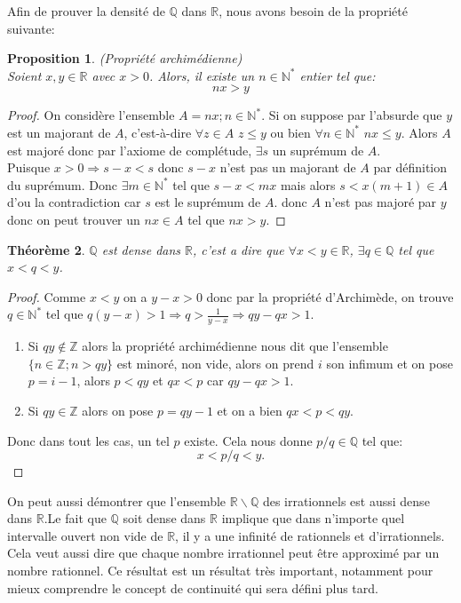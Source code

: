 \documentclass[a4paper, 12pt, french, twoside]{article}
\newtheorem{theorem}{Théorème}[section]
\newtheorem{proposition}[theorem]{Proposition}
\newcommand{\Nn}{{\mathbb{N}}}
\newcommand{\Zz}{{\mathbb{Z}}}
\newcommand{\Rr}{{\mathbb{R}}}
\newcommand{\Qq}{{\mathbb{Q}}}
\begin{document}
\begin{tcolorbox}
    

Afin de prouver la densité de $\Qq$ dans $\Rr$, nous avons besoin de la propriété suivante: 
\begin{proposition}
    (\textit{Propriété archimédienne})\\
    Soient $x,y\in \Rr$ avec $x>0$. Alors, il existe un $n\in \Nn^*$ entier tel que:
    $$nx>y$$
\end{proposition}
\begin{proof}
    On considère l'ensemble $A={nx;n\in \Nn^*}$. Si on suppose par l'absurde que $y$ est un majorant de $A$, c'est-à-dire $\forall z\in A$ $z\leq y $ ou bien $\forall n\in \Nn^*$ $nx\leq y $. Alors $A$ est majoré donc par l'axiome de complétude, $\exists s$ un suprémum de $A$. \\
    Puisque $x>0\Rightarrow s-x<s$ donc $s-x$ n'est pas un majorant de $A$ par définition du suprémum. Donc $\exists m \in \Nn^*$ tel que $s-x<mx$ mais alors $s<x(m+1)\in A$ d'ou la contradiction car $s$ est le suprémum de $A$. donc $A$ n'est pas majoré par $y$ donc on peut trouver un $nx\in A$ tel que $nx>y$. 
\end{proof}


    

\begin{theorem}
   $\Qq$ est dense dans $\Rr$, c'est a dire que $\forall x<y \in \Rr$, $\exists q\in \Qq$ tel que $x<q<y$.  
\end{theorem}


\begin{proof}
    Comme $x<y$ on a $y-x>0$ donc par la propriété d'Archimède, on trouve $q\in \Nn^*$ tel que $q(y-x)>1 \Rightarrow q>\frac{1}{y-x}\Rightarrow qy-qx>1$. 
    \begin{enumerate}
        \item Si $qy\notin \Zz$ alors la propriété archimédienne nous dit que l'ensemble $\{n\in \Zz; n>qy\}$ est minoré, non vide, alors on prend $i$ son infimum et on pose $p=i-1$, alors $p<qy$ et $qx<p$ car $qy-qx>1$. 
        \item Si $qy\in \Zz$ alors on pose $p=qy-1$ et on a bien $qx<p<qy$. 
    \end{enumerate}
    Donc dans tout les cas, un tel $p$ existe. Cela nous donne $p/q \in \Qq$ tel que: 
    $$x<p/q<y.$$
\end{proof}


\end{tcolorbox}
 On peut aussi démontrer que l'ensemble $\Rr \backslash \Qq$ des irrationnels est aussi dense dans $\Rr$.Le fait que $\Qq$ soit dense dans $\Rr$ implique que dans n'importe quel intervalle ouvert non vide de $\Rr$, il y a une infinité de rationnels et d'irrationnels. Cela veut aussi dire que chaque nombre irrationnel peut être approximé par un nombre rationnel. Ce résultat est un résultat très important, notamment pour mieux comprendre le concept de continuité qui sera défini plus tard. 
\end{document}
